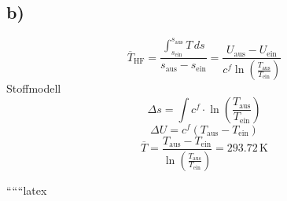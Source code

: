 

\subsection*{b)}

\[
\overline{T}_{\text{HF}} = \frac{\int_{s_{\text{ein}}}^{s_{\text{aus}}} T \, ds}{s_{\text{aus}} - s_{\text{ein}}} = \frac{U_{\text{aus}} - U_{\text{ein}}}{c^f \ln \left( \frac{T_{\text{aus}}}{T_{\text{ein}}} \right)}
\]
Stoffmodell
\[
\Delta s = \int c^f \cdot \ln \left( \frac{T_{\text{aus}}}{T_{\text{ein}}} \right)
\]
\[
\Delta U = c^f \left( T_{\text{aus}} - T_{\text{ein}} \right)
\]
\[
\overline{T} = \frac{T_{\text{aus}} - T_{\text{ein}}}{\ln \left( \frac{T_{\text{aus}}}{T_{\text{ein}}} \right)} = 293.72 \, \text{K}
\]

``````latex